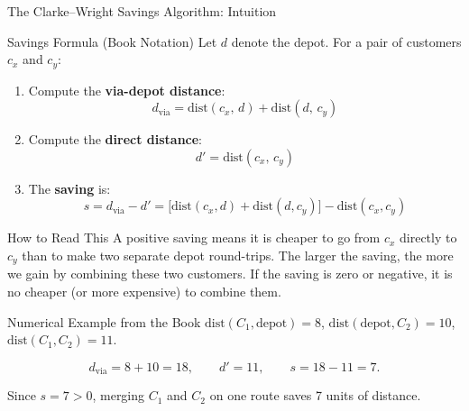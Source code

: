 \documentclass[aspectratio=169,10pt]{beamer}
\begin{document}
\begin{frame}[allowframebreaks]{The Clarke--Wright Savings Algorithm: Intuition}
  \begin{block}{Savings Formula (Book Notation)}
    Let $d$ denote the depot.  For a pair of customers $c_x$ and $c_y$:
    \begin{enumerate}
      \item Compute the \textbf{via-depot distance}:
        \[
          d_{\text{via}} = \mathrm{dist}(c_x,\, d) + \mathrm{dist}(d,\, c_y)
        \]
      \item Compute the \textbf{direct distance}:
        \[
          d' = \mathrm{dist}(c_x,\, c_y)
        \]
      \item The \textbf{saving} is:
        \[
          s = d_{\text{via}} - d' = \bigl[\mathrm{dist}(c_x, d) + \mathrm{dist}(d, c_y)\bigr] - \mathrm{dist}(c_x, c_y)
        \]
    \end{enumerate}
  \end{block}

  \begin{alertblock}{How to Read This}
    A positive saving means it is cheaper to go from $c_x$ directly to $c_y$
    than to make two separate depot round-trips.  The larger the saving, the
    more we gain by combining these two customers.  If the saving is zero or
    negative, it is no cheaper (or more expensive) to combine them.
  \end{alertblock}

  \begin{exampleblock}{Numerical Example from the Book}
    $\mathrm{dist}(C_1, \text{depot}) = 8$, \quad
    $\mathrm{dist}(\text{depot}, C_2) = 10$, \quad
    $\mathrm{dist}(C_1, C_2) = 11$.

    \[
      d_{\text{via}} = 8 + 10 = 18, \qquad d' = 11, \qquad s = 18 - 11 = 7.
    \]

    Since $s = 7 > 0$, merging $C_1$ and $C_2$ on one route saves 7 units of
    distance.
  \end{exampleblock}

\end{frame}
\end{document}
